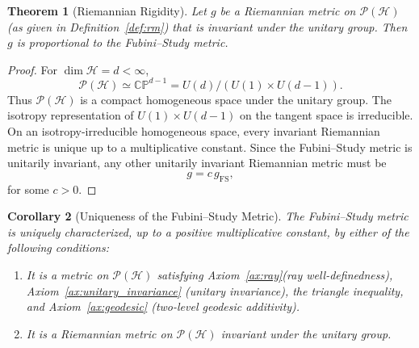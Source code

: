 \documentclass[aps,pra,reprint,nofootinbib,showpacs,superscriptaddress]{revtex4-1}
\newtheorem{theorem}{Theorem}[section]
\newtheorem{corollary}[theorem]{Corollary}
\newcommand{\Hilbert}{\mathcal{H}}
\newcommand{\Proj}{\mathcal{P}}
\begin{document}
\begin{theorem}[Riemannian Rigidity]
\label{thm:riemannian_rigidity}
Let $g$ be a Riemannian metric on $\Proj(\Hilbert)$ (as given in Definition~\ref{def:rm})
that is invariant under the unitary group.
Then $g$ is proportional to the Fubini--Study metric.
\end{theorem}
\begin{proof}
For $\dim\Hilbert = d < \infty$,
\[
\Proj(\Hilbert)
\simeq
\mathbb{CP}^{d-1}
=
U(d)/(U(1)\times U(d-1)).
\]
Thus $\Proj(\Hilbert)$ is a compact homogeneous
space under the unitary group. The isotropy representation of
$U(1)\times U(d-1)$ on the tangent space
is irreducible.
On an isotropy-irreducible homogeneous space,
every invariant Riemannian metric is unique
up to a multiplicative constant. Since the Fubini--Study metric is
unitarily invariant, any other unitarily
invariant Riemannian metric must be
\[
g = c\, g_{\mathrm{FS}},
\]
for some $c>0$.
\end{proof}
\begin{corollary}[Uniqueness of the Fubini--Study Metric]
\label{cor:fs_uniqueness}
The Fubini--Study metric is uniquely characterized, up to a positive
multiplicative constant, by either of the following conditions:

\begin{enumerate}[label=(\roman*)]
\item It is a metric on $\Proj(\Hilbert)$ satisfying
Axiom~\ref{ax:ray}(ray well-definedness), Axiom~\ref{ax:unitary_invariance} (unitary invariance),
the triangle inequality, and Axiom~\ref{ax:geodesic} (two-level geodesic additivity).

\item It is a Riemannian metric on $\Proj(\Hilbert)$
invariant under the unitary group.
\end{enumerate}
\end{corollary}

\end{document}
